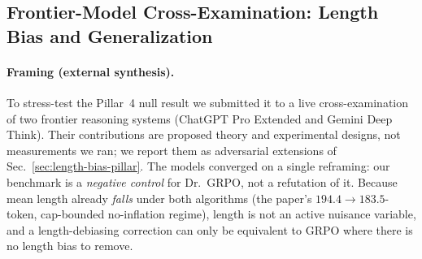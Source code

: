 
\subsection{Frontier-Model Cross-Examination: Length Bias and Generalization}
\label{sec:frontier-length-bias}

\paragraph{Framing (external synthesis).}
To stress-test the Pillar~4 null result we submitted it to a live
cross-examination of two frontier reasoning systems (ChatGPT Pro Extended and
Gemini Deep Think). Their contributions are proposed theory and experimental
designs, not measurements we ran; we report them as adversarial extensions of
Sec.~\ref{sec:length-bias-pillar}. The models converged on a single reframing:
our benchmark is a \emph{negative control} for Dr.~GRPO, not a refutation of it.
Because mean length already \emph{falls} under both algorithms (the paper's
$194.4\!\to\!183.5$-token, cap-bounded no-inflation regime), length is not an
active nuisance variable, and a length-debiasing correction can only be equivalent to GRPO where
there is no length bias to remove.

